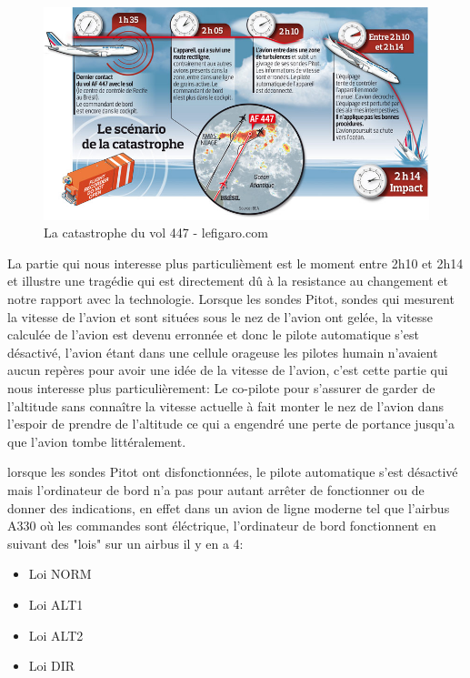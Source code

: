         \begin{figure}[H]
            \centering
            \includegraphics[width=1\textwidth]{Images/447}
            \caption{La catastrophe du vol 447 - lefigaro.com}
            \label{fig:447airfrance}
        \end{figure}

        La partie qui nous interesse plus particulièment est le moment entre 2h10 et 2h14 et illustre 
        une tragédie qui est directement dû à la resistance au changement et notre rapport avec la 
        technologie. \newline 
        Lorsque les sondes Pitot, sondes qui mesurent la vitesse de l'avion et sont situées sous
        le nez de l'avion ont gelée, la vitesse calculée de l'avion est devenu erronnée
        et donc le pilote automatique s'est désactivé, l'avion étant dans une cellule orageuse 
        les pilotes humain n'avaient aucun repères pour avoir une idée de la vitesse de l'avion,
        c'est cette partie qui nous interesse plus particulièrement: 
        Le co-pilote pour s'assurer de garder de l'altitude sans connaître la vitesse actuelle 
        à fait monter le nez de l'avion dans l'espoir de prendre de l'altitude ce qui a engendré 
        une perte de portance jusqu'a que l'avion tombe littéralement. 
        \newline 

        lorsque les sondes Pitot ont disfonctionnées, le pilote automatique s'est désactivé 
        mais l'ordinateur de bord n'a pas pour autant arrêter de fonctionner ou de donner 
        des indications, en effet dans un avion de ligne moderne tel que l'airbus A330
        où les commandes sont éléctrique, l'ordinateur de bord fonctionnent en suivant 
        des "lois" sur un airbus il y en a 4: 
        
        \begin{itemize}
            \item Loi NORM
            \item Loi ALT1
            \item Loi ALT2 
            \item Loi DIR
        \end{itemize}

